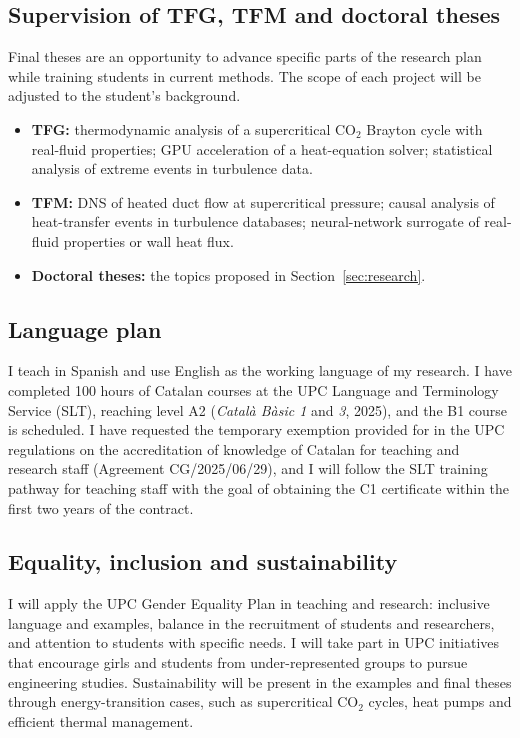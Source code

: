 \documentclass[11pt]{article}
\begin{document}
\subsection{Supervision of TFG, TFM and doctoral theses}\label{sec:theses}
Final theses are an opportunity to advance specific parts of the research plan while
training students in current methods. The scope of each project will be adjusted to the
student's background.
\begin{itemize}
  \item \textbf{TFG:} thermodynamic analysis of a supercritical CO$_2$ Brayton cycle with
  real-fluid properties; GPU acceleration of a heat-equation solver; statistical analysis
  of extreme events in turbulence data.
  \item \textbf{TFM:} DNS of heated duct flow at supercritical pressure; causal analysis of
  heat-transfer events in turbulence databases; neural-network surrogate of real-fluid
  properties or wall heat flux.
  \item \textbf{Doctoral theses:} the topics proposed in Section~\ref{sec:research}.
\end{itemize}

\subsection{Language plan}
I teach in Spanish and use English as the working language of my research. I have
completed 100 hours of Catalan courses at the UPC Language and Terminology Service (SLT),
reaching level A2 (\emph{Catal\`a B\`asic 1} and \emph{3}, 2025), and the B1 course is
scheduled. I have requested the temporary exemption provided for in the UPC regulations on
the accreditation of knowledge of Catalan for teaching and research staff (Agreement
CG/2025/06/29), and I will follow the SLT training pathway for teaching staff with the goal
of obtaining the C1 certificate within the first two years of the contract. 

\subsection{Equality, inclusion and sustainability}
I will apply the UPC Gender Equality Plan in teaching and research: inclusive language and
examples, balance in the recruitment of students and researchers, and attention to
students with specific needs. I will take part in UPC initiatives that encourage girls and
students from under-represented groups to pursue engineering studies. Sustainability will
be present in the examples and final theses through energy-transition cases, such as
supercritical CO$_2$ cycles, heat pumps and efficient thermal management.
\end{document}
